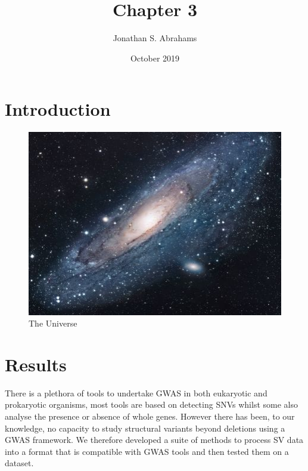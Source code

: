\documentclass{article}
\title{Chapter 3}
\author{Jonathan S. Abrahams }
\date{October 2019}
\begin{document}
\maketitle

\section{Introduction}








\begin{figure}[h!]
\centering
\includegraphics[scale=1.7]{universe}
\caption{The Universe}
\label{fig:universe}
\end{figure}

\section{Results}

There is a plethora of tools to undertake GWAS in both eukaryotic and prokaryotic organisms, most tools are based on detecting SNVs whilst some also analyse the presence or absence of whole genes. However there has been, to our knowledge, no capacity to study structural variants beyond deletions using a GWAS framework. We therefore developed a suite of methods to process SV data into a format that is compatible with GWAS tools and then tested them on a dataset.
\end{document}
